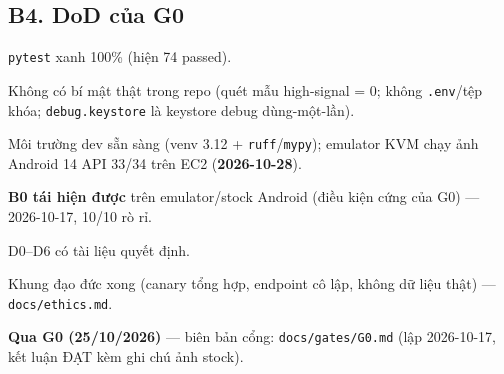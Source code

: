 \documentclass[11pt,a4paper]{article}
\newcommand{\done}{\textcolor{shgreen}{$\blacksquare$}}
\newcommand{\code}[1]{\texttt{\small #1}}
\begin{document}
\subsection*{B4. DoD của G0}
\begin{chk}
\item[\done] \code{pytest} xanh 100\% (hiện 74 passed).
\item[\done] Không có bí mật thật trong repo (quét mẫu high-signal = 0; không \code{.env}/tệp khóa; \code{debug.keystore} là keystore debug dùng-một-lần).
\item[\done] Môi trường dev sẵn sàng (venv 3.12 + \code{ruff}/\code{mypy}); emulator KVM chạy ảnh Android 14 API 33/34 trên EC2 (\textbf{2026-10-28}).
\item[\done] \textbf{B0 tái hiện được} trên emulator/stock Android (điều kiện cứng của G0) --- 2026-10-17, 10/10 rò rỉ.
\item[\done] D0--D6 có tài liệu quyết định.
\item[\done] Khung đạo đức xong (canary tổng hợp, endpoint cô lập, không dữ liệu thật) --- \code{docs/ethics.md}.
\item[\done] \textbf{Qua G0 (25/10/2026)} --- biên bản cổng: \code{docs/gates/G0.md} (lập 2026-10-17, kết luận ĐẠT kèm ghi chú ảnh stock).
\end{chk}
\end{document}
